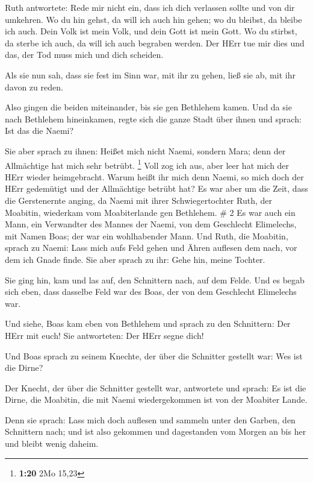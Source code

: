  Ruth antwortete: Rede mir nicht ein, dass ich dich
verlassen sollte und von dir umkehren. Wo du hin gehst, da will ich auch
hin gehen; wo du bleibst, da bleibe ich auch. Dein Volk ist mein Volk,
und dein Gott ist mein Gott.  Wo du stirbst, da sterbe ich
auch, da will ich auch begraben werden. Der HErr tue mir dies und das,
der Tod muss mich und dich scheiden.

 Als sie nun sah, dass sie fest im Sinn war, mit ihr zu
gehen, ließ sie ab, mit ihr davon zu reden.

 Also gingen die beiden miteinander, bis sie gen Bethlehem
kamen. Und da sie nach Bethlehem hineinkamen, regte sich die ganze Stadt
über ihnen und sprach: Ist das die Naemi?

 Sie aber sprach zu ihnen: Heißet mich nicht Naemi, sondern
Mara; denn der Allmächtige hat mich sehr betrübt. \footnote{\textbf{1:20}
  2Mo 15,23}  Voll zog ich aus, aber leer hat mich der HErr
wieder heimgebracht. Warum heißt ihr mich denn Naemi, so mich doch der
HErr gedemütigt und der Allmächtige betrübt hat?  Es war
aber um die Zeit, dass die Gerstenernte anging, da Naemi mit ihrer
Schwiegertochter Ruth, der Moabitin, wiederkam vom Moabiterlande gen
Bethlehem. \# 2  Es war auch ein Mann, ein Verwandter des
Mannes der Naemi, von dem Geschlecht Elimelechs, mit Namen Boas; der war
ein wohlhabender Mann.  Und Ruth, die Moabitin, sprach zu
Naemi: Lass mich aufs Feld gehen und Ähren auflesen dem nach, vor dem
ich Gnade finde. Sie aber sprach zu ihr: Gehe hin, meine Tochter.

 Sie ging hin, kam und las auf, den Schnittern nach, auf dem
Felde. Und es begab sich eben, dass dasselbe Feld war des Boas, der von
dem Geschlecht Elimelechs war.

 Und siehe, Boas kam eben von Bethlehem und sprach zu den
Schnittern: Der HErr mit euch! Sie antworteten: Der HErr segne dich!

 Und Boas sprach zu seinem Knechte, der über die Schnitter
gestellt war: Wes ist die Dirne?

 Der Knecht, der über die Schnitter gestellt war, antwortete
und sprach: Es ist die Dirne, die Moabitin, die mit Naemi wiedergekommen
ist von der Moabiter Lande.

 Denn sie sprach: Lass mich doch auflesen und sammeln unter
den Garben, den Schnittern nach; und ist also gekommen und dagestanden
vom Morgen an bis her und bleibt wenig daheim.

